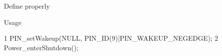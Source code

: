 
\begin{DoxyRefList}
\item[\label{todo__todo000001}%
\hypertarget{todo__todo000001}{}%
global\+Scope$>$ Global \hyperlink{_p_i_n_c_c26_x_x_8h_a7eea7460f3e2d4c68df55239471805aa}{P\+I\+N\+C\+C26\+X\+X\+\_\+set\+Wakeup} (const P\+I\+N\+\_\+\+Config a\+Pin\+Cfg\mbox{[}\mbox{]})]Define properly \begin{DoxyParagraph}{Usage}

\begin{DoxyCode}
1 PIN\_setWakeup(NULL, PIN\_ID(9)|PIN\_WAKEUP\_NEGEDGE);
2 Power\_enterShutdown();
\end{DoxyCode}
 
\end{DoxyParagraph}

\end{DoxyRefList}